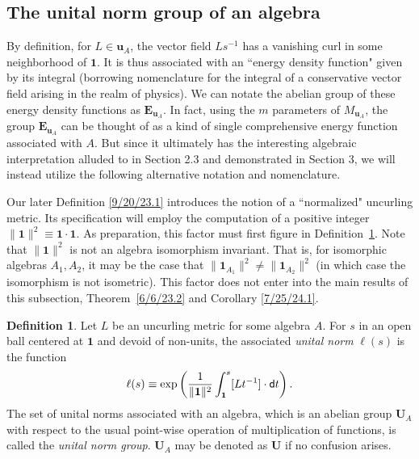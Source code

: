 \documentclass{amsart}
\numberwithin{equation}{section}
\theoremstyle{definition}
\newtheorem{definition}[theorem]{Definition}
\numberwithin{theorem}{section}
\begin{document}
\subsection{The unital norm group of an algebra} By definition, for \mbox{$L\in \mathbf{u}_A$}, the vector field $Ls^{-1}$ has a vanishing curl in some neighborhood of $\mathbf{1}$.  It is thus associated with an ``energy density function" given by its integral (borrowing nomenclature for the integral of a conservative vector field arising in the realm of physics).   
 We can notate the abelian group of these energy density functions as $\mathbf{E}_{\mathbf{u}_A}$.  In fact, using the $m$ parameters of $M_{\mathbf{u}_A}$, the group $\mathbf{E}_{\mathbf{u}_A}$ can be thought of as a kind of single comprehensive energy function associated with $A$.  But since it ultimately has the interesting algebraic interpretation alluded to in Section 2.3 and demonstrated in Section 3, we will instead utilize the following alternative notation and nomenclature.
  
Our later Definition \ref{9/20/23.1} introduces the notion of a ``normalized" uncurling metric.  Its specification will employ the computation of a positive integer $\|\mathbf{1}\|^2 \equiv \mathbf{1} \cdot \mathbf{1}$. As preparation, this factor must first figure in \mbox{Definition \ref{9/21/23.2}}.   Note that $\|\mathbf{1}\|^2$ is not an algebra isomorphism invariant.  That is, for isomorphic algebras $A_1,A_2$, it may be the case that $\|\mathbf{1}_{A_1}\|^2 \ne \|\mathbf{1}_{A_2}\|^2$ (in which case the isomorphism is not isometric).  This factor does not enter into the main results of this subsection, \mbox{Theorem \ref{6/6/23.2}} and Corollary \ref{7/25/24.1}.
  
  \begin{definition}\label{9/21/23.2} Let $L$ be an uncurling metric for some algebra $A$.  For $s$ in an open ball centered at $\mathbf{1}$ and devoid of non-units, the associated {\it unital norm} $ \ell(s)$ is the function 
  \begin{equation}\label{11/7/20.2}   \ell(s) \equiv \exp\left(\frac{1}{\|{\bf 1}\|^2}\int_{\bf 1}^s [Lt^{-1}]\cdot {\sf d}t\right).\end{equation} 
   The set of unital norms associated with an algebra, which is an abelian group $\mathbf{U}_A$ with respect to the usual point-wise operation of multiplication of functions, is called the {\it unital norm group}. $\mathbf{U}_A$ may be denoted as $\mathbf{U}$ if no confusion arises. \end{definition} 
   
\end{document}
